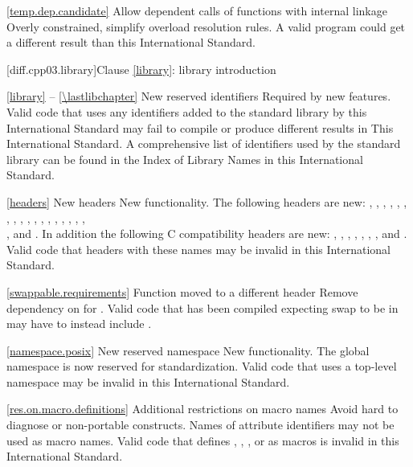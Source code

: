 \ref{temp.dep.candidate}
\change Allow dependent calls of functions with internal linkage
\rationale Overly constrained, simplify overload resolution rules.
\effect
A valid \CppIII program could get a different result than this
International Standard.

[diff.cpp03.library]{Clause \ref{library}: library introduction}

\ref{library} -- \ref{\lastlibchapter}
\change New reserved identifiers
\rationale Required by new features.
\effect
Valid \CppIII code that uses any identifiers added to the \Cpp standard
library by this International Standard may fail to compile or produce different
results in This International Standard. A comprehensive list of identifiers used
by the \Cpp standard library can be found in the Index of Library Names in this
International Standard.

\ref{headers}
\change New headers
\rationale New functionality.
\effect
The following \Cpp headers are new:
,
,
,
,
,
,
,
,
,
,
,
,
,
,
,
,
,
,\\
,
and
.
In addition the following C compatibility headers are new:
,
,
,
,
,
,
,
and
.
Valid \CppIII code that  headers with these names may be
invalid in this International Standard.

\ref{swappable.requirements}
\effect Function  moved to a different header
\rationale Remove dependency on  for .
\effect Valid \CppIII code that has been compiled expecting swap to be in
 may have to instead include .

\ref{namespace.posix}
\change New reserved namespace
\rationale New functionality.
\effect
The global namespace  is now reserved for standardization. Valid
\CppIII code that uses a top-level namespace  may be invalid in
this International Standard.

\ref{res.on.macro.definitions}
\change Additional restrictions on macro names
\rationale Avoid hard to diagnose or non-portable constructs.
\effect
Names of attribute identifiers may not be used as macro names. Valid  code that defines , ,
, or  as macros is invalid in this
International Standard.


